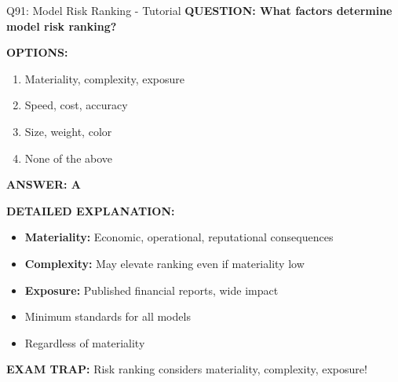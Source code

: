 \documentclass[8pt]{beamer}
\begin{document}
	\begin{frame}{Q91: Model Risk Ranking - Tutorial}
		\fontsize{6.5}{7.5}\selectfont
		\textbf{QUESTION: What factors determine model risk ranking?}
		
		\vspace{0.1cm}
		\textbf{OPTIONS:}
		\begin{enumerate}
			\item Materiality, complexity, exposure
			\item Speed, cost, accuracy
			\item Size, weight, color
			\item None of the above
		\end{enumerate}
		
		\vspace{0.1cm}
		\textcolor{myblue}{\textbf{ANSWER: A}}
		
		\vspace{0.1cm}
		\textbf{DETAILED EXPLANATION:}
		\begin{itemize}
			\item \textbf{Materiality:} Economic, operational, reputational consequences
			\item \textbf{Complexity:} May elevate ranking even if materiality low
			\item \textbf{Exposure:} Published financial reports, wide impact
			\item Minimum standards for all models
			\item Regardless of materiality
		\end{itemize}
		
		\vspace{0.1cm}
		\textcolor{myred}{\textbf{EXAM TRAP:}} Risk ranking considers \textcolor{myblue}{materiality, complexity, exposure}!
	\end{frame}
	
\end{document}

